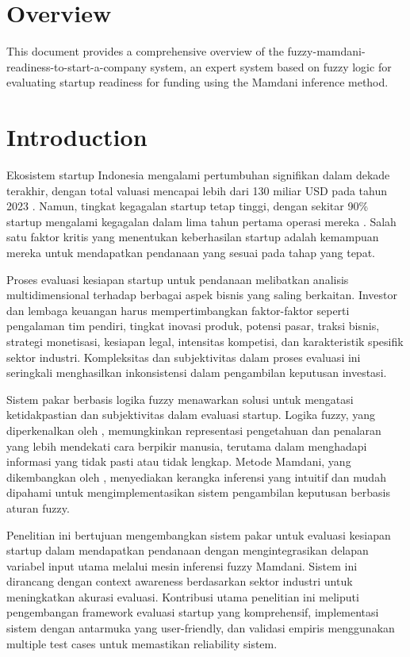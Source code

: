\documentclass{article}
\begin{document}
\section{Overview}
This document provides a comprehensive overview of the fuzzy-mamdani-readiness-to-start-a-company system, an expert system based on fuzzy logic for evaluating startup readiness for funding using the Mamdani inference method.

\section{Introduction}

Ekosistem startup Indonesia mengalami pertumbuhan signifikan dalam dekade terakhir, dengan total valuasi mencapai lebih dari 130 miliar USD pada tahun 2023 \citep{Sartika2023}. Namun, tingkat kegagalan startup tetap tinggi, dengan sekitar 90\% startup mengalami kegagalan dalam lima tahun pertama operasi mereka \citep{Rahman2022}. Salah satu faktor kritis yang menentukan keberhasilan startup adalah kemampuan mereka untuk mendapatkan pendanaan yang sesuai pada tahap yang tepat.

Proses evaluasi kesiapan startup untuk pendanaan melibatkan analisis multidimensional terhadap berbagai aspek bisnis yang saling berkaitan. Investor dan lembaga keuangan harus mempertimbangkan faktor-faktor seperti pengalaman tim pendiri, tingkat inovasi produk, potensi pasar, traksi bisnis, strategi monetisasi, kesiapan legal, intensitas kompetisi, dan karakteristik spesifik sektor industri. Kompleksitas dan subjektivitas dalam proses evaluasi ini seringkali menghasilkan inkonsistensi dalam pengambilan keputusan investasi.

Sistem pakar berbasis logika fuzzy menawarkan solusi untuk mengatasi ketidakpastian dan subjektivitas dalam evaluasi startup. Logika fuzzy, yang diperkenalkan oleh \citet{Zadeh1965}, memungkinkan representasi pengetahuan dan penalaran yang lebih mendekati cara berpikir manusia, terutama dalam menghadapi informasi yang tidak pasti atau tidak lengkap. Metode Mamdani, yang dikembangkan oleh \citet{Mamdani1975}, menyediakan kerangka inferensi yang intuitif dan mudah dipahami untuk mengimplementasikan sistem pengambilan keputusan berbasis aturan fuzzy.

Penelitian ini bertujuan mengembangkan sistem pakar untuk evaluasi kesiapan startup dalam mendapatkan pendanaan dengan mengintegrasikan delapan variabel input utama melalui mesin inferensi fuzzy Mamdani. Sistem ini dirancang dengan context awareness berdasarkan sektor industri untuk meningkatkan akurasi evaluasi. Kontribusi utama penelitian ini meliputi pengembangan framework evaluasi startup yang komprehensif, implementasi sistem dengan antarmuka yang user-friendly, dan validasi empiris menggunakan multiple test cases untuk memastikan reliability sistem.
\end{document}
